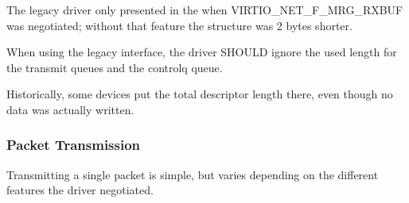 The legacy driver only presented  in the 
when VIRTIO_NET_F_MRG_RXBUF was negotiated; without that feature the
structure was 2 bytes shorter.

When using the legacy interface, the driver SHOULD ignore the
used length for the transmit queues
and the controlq queue.
\begin{note}
Historically, some devices put
the total descriptor length there, even though no data was
actually written.
\end{note}

\subsubsection{Packet Transmission}\label{sec:Device Types / Network Device / Device Operation / Packet Transmission}

Transmitting a single packet is simple, but varies depending on
the different features the driver negotiated.

